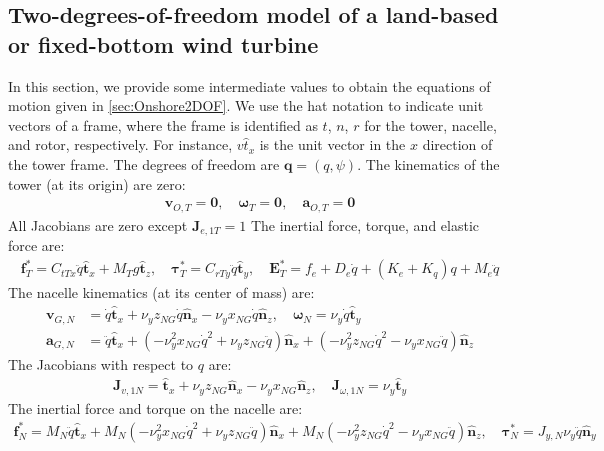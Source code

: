 \documentclass[wes, manuscript]{copernicus}
\renewcommand{\v}[1]{\boldsymbol{#1}}
\begin{document}
\subsection{Two-degrees-of-freedom model of a land-based or fixed-bottom wind turbine}
\label{sec:Onshore2DOFEq}
In this section, we provide some intermediate values to obtain the equations of motion given in \autoref{sec:Onshore2DOF}.
We use the hat notation to indicate unit vectors of a frame, where the frame is identified as $t$, $n$, $r$ for the tower, nacelle, and rotor, respectively. For instance, $v{\hat{t}}_x$  is the unit vector in the $x$ direction of the tower frame.
% 
The degrees of freedom are $\v{q}=(q,\psi)$.
The kinematics of the tower (at its origin) are zero:
\begin{align}
\v{v}_{O,T} = \v{0}
, \quad
\v{\omega}_{T} = \v{0}
, \quad
\v{a}_{O,T} = \v{0}
\end{align}
All Jacobians are zero except $\v{J}_{e,1T}=1$
The inertial force, torque, and elastic force are:
\begin{align}
\v{f}^*_T = C_{t Tx} \ddot{q}\v{\hat{t}}_x + M_{T} g\v{\hat{t}}_z
    ,\quad
\v{\tau}^*_T =  C_{r Ty} \ddot{q}\v{\hat{t}}_y
    ,\quad
\v{E}_T^*= f_e + D_{e} \dot{q} + (K_{e}+K_q) q + M_{e} \ddot{q}
\end{align}
The nacelle kinematics (at its center of mass) are:
\begin{align}
\v{v}_{G,N} &=  \dot{q}\v{\hat{t}}_x + \nu_y z_{NG} \dot{q}\v{\hat{n}}_x -  \nu_y x_{NG} \dot{q}\v{\hat{n}}_z
,\quad
\v{\omega}_{N} = \nu_y \dot{q}\v{\hat{t}}_y
\\
\v{a}_{G,N} &=  \ddot{q}\v{\hat{t}}_x + (- \nu_y^{2} x_{NG} \dot{q}^{2} + \nu_y z_{NG} \ddot{q})\v{\hat{n}}_x + (- \nu_y^{2} z_{NG} \dot{q}^{2} - \nu_y x_{NG} \ddot{q})\v{\hat{n}}_z
\end{align}
The Jacobians with respect to $q$ are:
\begin{align}
\v{J}_{v,1N}=\v{\hat{t}}_x + \nu_y z_{NG}\v{\hat{n}}_x -  \nu_y x_{NG}\v{\hat{n}}_z
, \quad
\v{J}_{\omega,1N}=\nu_y\v{\hat{t}}_y
\end{align}
The inertial force and torque on the nacelle are:
\begin{align}
\v{f}^*_N = 
M_N  \ddot{q}\v{\hat{t}}_x + M_N \left(- \nu_y^{2} x_{NG} \dot{q}^{2} + \nu_y z_{NG} \ddot{q}\right)\v{\hat{n}}_x + M_N \left(- \nu_y^{2} z_{NG} \dot{q}^{2} - \nu_y x_{NG} \ddot{q}\right)\v{\hat{n}}_z
    ,\quad
\v{\tau}_N^* = 
J_{y,N} \nu_y \ddot{q}\v{\hat{n}}_y
\end{align}
\end{document}
